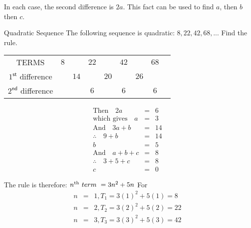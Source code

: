 In each case, the second difference is $2a$.
This fact can be used to find $a$, then $b$ then $c$.

\begin{wex}{Quadratic Sequence}
{The following sequence is quadratic: $8, 22, 42, 68, ...$
Find the rule.}{
\begin{center}
\begin{tabular}{ccccccccc}
TERMS & $8$ && $22$ && $42$ && $68$ & \\
$1^{\textsf{st}}$ difference && $14$ && $20$ && $26$ \\ 
$2^{\textsf{nd}}$ difference &&& $6$ && $6$ && $6$ & \\
\end{tabular}
\end{center}

\begin{eqnarray*}
\textrm{Then} \quad  2a &=& 6 \\
\textrm{which gives} \quad a &=& 3\\
\textrm{And} \quad  3a + b &=& 14\\   
\therefore \quad 9 + b &=& 14  \\
 b &=& 5\\
\textrm{And} \quad  a + b + c  &=& 8\\  
\therefore \quad 3 + 5 + c &=& 8\\
 c &=& 0
\end{eqnarray*}

The rule is therefore: \quad $n^{\rm th} ~term~ = 3n^2 + 5n$
For
\begin{eqnarray*}
n &=& 1, T_1 = 3(1)^2 + 5(1) = 8\\
n &=& 2, T_2 = 3(2)^2 + 5(2) = 22\\
n &=& 3, T_3 = 3(3)^2 + 5(3) = 42
\end{eqnarray*}
}
\end{wex}


